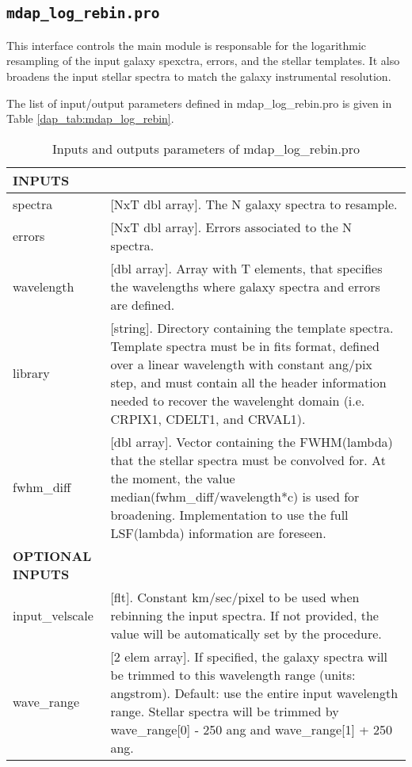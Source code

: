 \subsection{{\tt mdap\_log\_rebin.pro}}
\label{dap_sec:mdap_log_rebin}

This interface controls the main module is responsable for the
logarithmic resampling of the input galaxy spexctra, errors, and the
stellar templates. It also broadens the input stellar spectra to match
the galaxy instrumental resolution. 

The list of input/output parameters defined in mdap\_log\_rebin.pro is
given in Table \ref{dap_tab:mdap_log_rebin}.



\begin{center}
\begin{longtable}{p{2.7cm}| p{11.1cm}}
\caption{Inputs and outputs parameters of mdap\_log\_rebin.pro} \label{dap_tab::mdap_log_rebin} \\
\hline
\endfirsthead
\hline
\endhead
\hline
\endlastfoot
\hline
{\bf  INPUTS} &  \\
\hline
spectra   &   [NxT dbl array].  The N galaxy spectra to resample.\\
%
errors    &   [NxT dbl array].  Errors associated to the N spectra.\\
%
wavelength & [dbl array].     Array with T elements, that specifies the wavelengths where galaxy spectra and errors are defined.\\
%
library    &  [string].          Directory containing the template spectra. Template spectra must be in fits format, defined over a 
                             linear wavelength with constant ang/pix step, and must contain all the header information needed to  
                             recover the wavelenght domain (i.e. CRPIX1, CDELT1, and CRVAL1).\\
%
fwhm\_diff &   [dbl array].     Vector containing the FWHM(lambda) that the stellar spectra must be convolved for. At the moment, 
                             the value median(fwhm\_diff/wavelength*c) is used for broadening. Implementation to use the full 
                             LSF(lambda) information are foreseen.\\
%
\hline
{\bf  OPTIONAL INPUTS} & \\
\hline
input\_velscale & [flt].    Constant km/sec/pixel to be used when rebinning the input spectra. If not provided, the value will be
                             automatically set by the procedure.\\
%
wave\_range  & [2 elem array].   If specified, the galaxy spectra will be trimmed to this wavelength range (units: angstrom). Default: 
                             use the entire input wavelength range. Stellar spectra will be trimmed by 
                             wave\_range[0] - 250 ang and wave\_range[1] + 250 ang.\\


\end{longtable}
\end{center}
